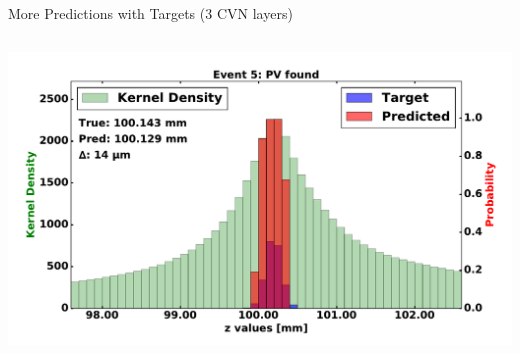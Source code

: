 \begin{frame}{More Predictions with Targets (3 CVN layers)}
\begin{columns}[c]
\begin{center}
           \includegraphics[width=1\textwidth, height=0.45\textwidth, trim=18 0 18 0]{images/120000_3layer_31.pdf}
       \end{center}
  \end{columns}
\end{frame}


